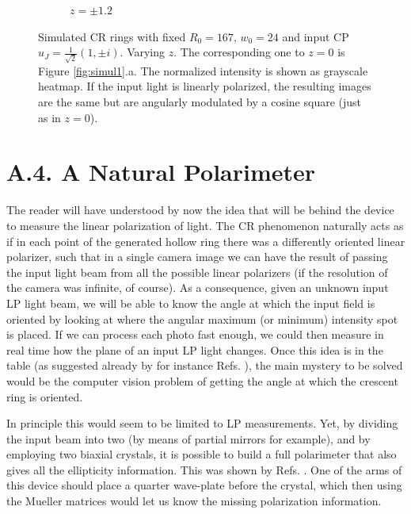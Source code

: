 \documentclass[11pt, a4paper, twoside]{article} %
\begin{document}
\begin{figure}[h!]
\begin{subfigure}[b]{0.245\linewidth}
    \caption{$z=\pm1.2$}
     \end{subfigure}
    \caption{Simulated CR rings with fixed $R_0=167$, $w_0=24$ and input CP $\hat{u}_J=\frac{1}{\sqrt{2}}(1,\pm i)$. Varying $z$. The corresponding one to $z=0$ is Figure \ref{fig:simul1}.a. The normalized intensity is shown as grayscale heatmap. If the input light is linearly polarized, the resulting images are the same but are angularly modulated by a cosine square (just as in $z=0$).}
            \label{fig:simul5}
\end{figure}
\section*{A.4. A Natural Polarimeter}
The reader will have understood by now the idea that will be behind the device to measure the linear polarization of light. The CR phenomenon naturally acts as if in each point of the generated hollow ring there was a differently oriented linear polarizer, such that in a single camera image we can have the result of passing the input light beam from all the possible linear polarizers (if the resolution of the camera was infinite, of course). As a consequence, given an unknown input LP light beam, we will be able to know the angle at which the input field is oriented by looking at where the angular maximum (or minimum) intensity spot is placed. If we can process each photo fast enough, we could then measure in real time how the plane of an input LP light changes. Once this idea is in the table (as suggested already by for instance Refs. \cite{Stokes1, Stokes2, incomplete}), the main mystery to be solved would be the computer vision problem of getting the angle at which the crescent ring is oriented.

In principle this would seem to be limited to LP measurements. Yet, by dividing the input beam into two (by means of partial mirrors for example), and by employing two biaxial crystals, it is possible to build a full polarimeter that also gives all the ellipticity information. This was shown by Refs. \cite{Stokes1, Stokes2}. One of the arms of this device should place a quarter wave-plate before the crystal, which then using the Mueller matrices would let us know the missing polarization information.
\end{document}
